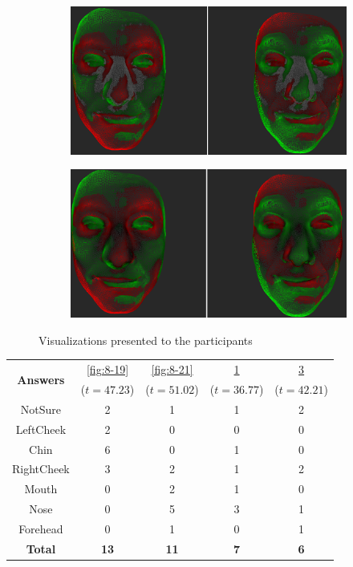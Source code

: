 \begin{figure}[h]
\begin{subfigure}{0.4\textwidth}
\includegraphics[width=\textwidth]{./screenshots/pair23.PNG}
\caption{}
\label{fig:8-23}
\end{subfigure}
\quad
\begin{subfigure}{0.4\textwidth}
\includegraphics[width=\textwidth]{./screenshots/pair20.PNG}
\caption{}
\label{fig:8-20}
\end{subfigure}
\caption{Visualizations presented to the participants}
\end{figure}
\medskip
\begin{center}
\begin{tabular}{| c | c | c | c | c |}
	\hline
\multirow{2}{*}{\bf Answers} & \ref{fig:8-19} & \ref{fig:8-21} & \ref{fig:8-23} & \ref{fig:8-20}\\
	&  (\(t=47.23\)) &  (\(t=51.02\)) &  (\(t=36.77\)) &  (\(t=42.21\))\\ \hline
	NotSure & 2 & 1 & 1 & 2\\ \hline
	LeftCheek & 2 & 0 & 0 & 0\\ \hline
	Chin & 6 & 0 & 1 & 0\\ \hline
	RightCheek & 3 & 2 & 1 & 2\\ \hline
	Mouth & 0 & 2 & 1 & 0\\ \hline
	Nose & 0 & 5 & 3 & 1\\ \hline
	Forehead & 0 & 1 & 0 & 1\\ \hline
	{\bf Total} & {\bf 13} & {\bf 11} & {\bf 7} & {\bf 6}\\ \hline
\end{tabular}
\end{center}
\clearpage

